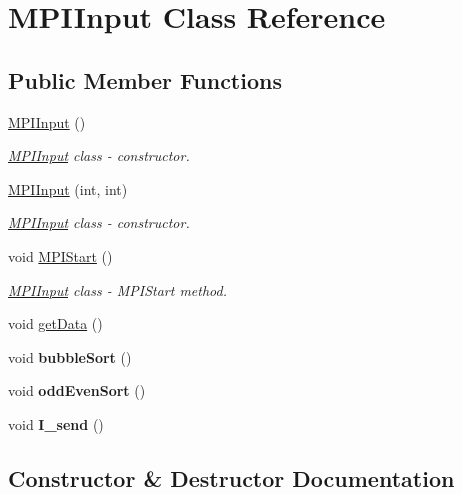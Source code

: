 \hypertarget{classMPIInput}{}\section{M\+P\+I\+Input Class Reference}
\label{classMPIInput}
\subsection*{Public Member Functions}
\begin{DoxyCompactItemize}
\item 
\hyperlink{classMPIInput_a1fd40b314f5e63f0948050dd687f2d6d}{M\+P\+I\+Input} ()
\begin{DoxyCompactList}\small\item\em \hyperlink{classMPIInput}{M\+P\+I\+Input} class -\/ constructor. \end{DoxyCompactList}\item 
\hyperlink{classMPIInput_aad9097968754daede74b4e9931f58c8a}{M\+P\+I\+Input} (int, int)
\begin{DoxyCompactList}\small\item\em \hyperlink{classMPIInput}{M\+P\+I\+Input} class -\/ constructor. \end{DoxyCompactList}\item 
void \hyperlink{classMPIInput_a5204b6d3bea6d1d6110b6d180da43e07}{M\+P\+I\+Start} ()
\begin{DoxyCompactList}\small\item\em \hyperlink{classMPIInput}{M\+P\+I\+Input} class -\/ M\+P\+I\+Start method. \end{DoxyCompactList}\item 
void \hyperlink{classMPIInput_ab573f01916c4e35072009b95602a1399}{get\+Data} ()
\item 
\mbox{\label{classMPIInput_a03c8faee4d48167f2ab33b52fad7e5ea}} 
void {\bfseries bubble\+Sort} ()
\item 
\mbox{\label{classMPIInput_a1c6165f90d30a3988eba3b9cea5afefa}} 
void {\bfseries odd\+Even\+Sort} ()
\item 
\mbox{\label{classMPIInput_ab90ddedf8faad1bfeb850d6303af50a5}} 
void {\bfseries I\+\_\+send} ()
\end{DoxyCompactItemize}


\subsection{Constructor \& Destructor Documentation}
\mbox{\label{classMPIInput_a1fd40b314f5e63f0948050dd687f2d6d}} 
